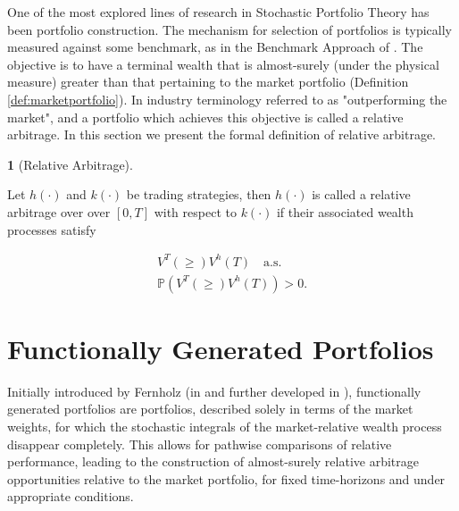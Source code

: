 \documentclass[british]{amsart}
\numberwithin{equation}{section}
\numberwithin{figure}{section}
\theoremstyle{plain}
\theoremstyle{definition}
\newtheorem{defn}[thm]{\protect\definitionname}
\theoremstyle{plain}
\theoremstyle{plain}
\theoremstyle{plain}
\theoremstyle{remark}
\theoremstyle{plain}
\providecommand{\definitionname}{Definition}
\newcommand{\almostsurely}{\text{a.s.}}
\newcommand{\measure}{\mathbb{P}}
\newcommand{\valueprocess}[2]{V^{#1}(#2)}
\begin{document}
One of the most explored lines of research in Stochastic Portfolio Theory has been portfolio construction. The mechanism for selection of portfolios is typically measured against some benchmark, as in the Benchmark Approach of \cite{platen2006}. The objective is to have a terminal wealth that is almost-surely (under the physical measure) greater than that pertaining to the market portfolio (Definition \ref{def:marketportfolio}). In industry terminology referred to as "outperforming the market", and a portfolio which achieves this objective is called a relative arbitrage. In this section we present the formal definition of relative arbitrage.



\begin{defn} [Relative Arbitrage]
	\label{def:relativearbitrage}

	Let $h(\cdot)$ and $k(\cdot)$ be trading strategies, then $h(\cdot)$ is called a relative arbitrage over over $[0,T]$ with respect to $k(\cdot)$ if their associated wealth processes satisfy

	\begin{gather*}
		\valueprocess{T} \ge \valueprocess{h}{T} \quad \almostsurely \\
		\measure(\valueprocess{T} \ge \valueprocess{h}{T}) > 0.
	\end{gather*}

\end{defn}

\newpage

\section{Functionally Generated Portfolios}

\newcommand{\CTwoFunction}{\mathcal{C}^2}

Initially introduced by Fernholz (in \cite{fernholz1999pgf} and further developed in \cite{fernholz2002}), functionally generated portfolios are portfolios, described solely in terms of the market weights, for which the stochastic integrals of the market-relative wealth process disappear completely. This allows for pathwise comparisons of relative performance, leading to the construction of almost-surely relative arbitrage opportunities relative to the market portfolio, for fixed time-horizons and under appropriate conditions.
\end{document}
